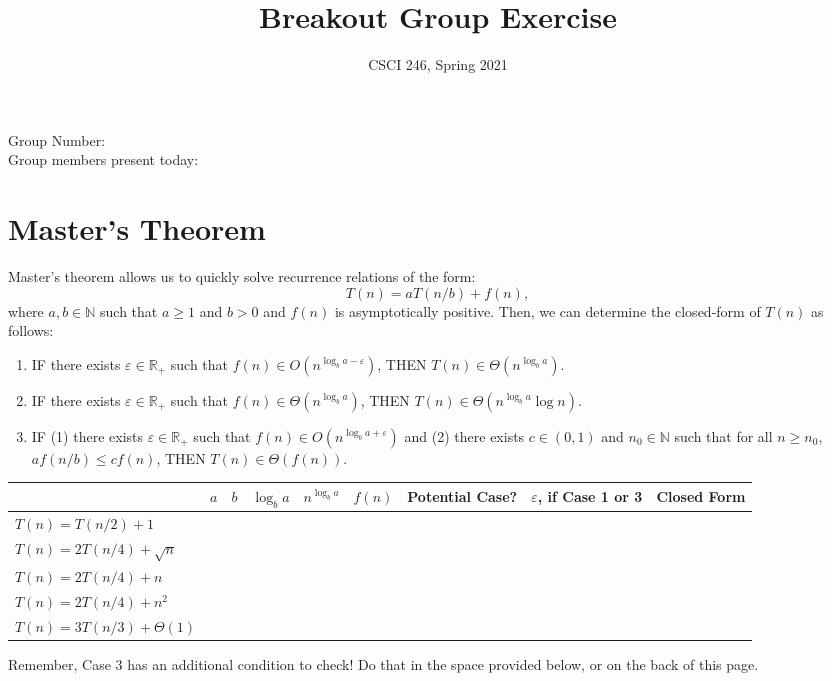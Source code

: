 \documentclass{article}
\title{Breakout Group Exercise}
\author{CSCI 246, Spring 2021}
\def\R{{\mathbb R}}
\def\N{{\mathbb N}}
\begin{document}
\maketitle

\noindent
Group Number:\\
Group members present today:

\section*{Master's Theorem}

Master's theorem allows us to quickly solve recurrence relations of the form:
$$ T(n) = a T(n/b) + f(n),$$
where $a, b \in \N$ such that $a \geq 1$ and $b >0$ and $f(n)$ is asymptotically
positive.  Then, we can determine the closed-form of $T(n)$ as follows:
\begin{enumerate}
    \item IF there exists $\varepsilon \in \R_+$ such that $f(n) \in O(n^{\log_b
        a - \varepsilon})$, THEN $T(n) \in \Theta(n^{\log_b a})$.
    \item IF there exists $\varepsilon \in \R_+$ such that $f(n) \in \Theta(n^{\log_b
        a})$, THEN $T(n) \in \Theta(n^{\log_b a}\log n)$.
    \item IF (1) there exists $\varepsilon \in \R_+$ such that $f(n) \in O(n^{\log_b
        a + \varepsilon})$
        and (2) there exists $c \in (0,1)$ and $n_0 \in \N$ such that for all $n
        \geq n_0$, $a f(n/b) \leq c f(n)$, THEN $T(n) \in \Theta(f(n))$.
\end{enumerate}

\begin{table}[h!]
    \centering
    \begin{tabular}{|l|l|l|l|l|l|l|l|l|}
        \hline
        &  $a$ & $b$  & $\log_b a$  & $n^{\log_b a}$  & $f(n)$  & Potential
        Case? & $\varepsilon$, if Case 1 or 3  & Closed Form \\ \hline
        \hline
        $T(n) = T(n/2)+1$             & &  &  &  &  & & & \\[5ex] \hline
        $T(n) = 2 T(n/4) + \sqrt{n}$  & &  &  &  & &  & & \\[5ex] \hline
        $T(n) = 2 T(n/4) + n$         & &  &  &  &  & & &  \\[5ex] \hline
        $T(n) = 2 T(n/4) + n^2$       & &  &  &  &  & & & \\[5ex] \hline
        $T(n) = 3 T(n/3) + \Theta(1)$ & &  &  &  & & & & \\[5ex] \hline
    \end{tabular}
\end{table}
Remember, Case 3 has an additional condition to check! Do that in the space
provided below, or on the back of this page.\\
\fbox{\begin{minipage}{6.5in}\hfill\vspace{1in}\end{minipage}}
\end{document}
